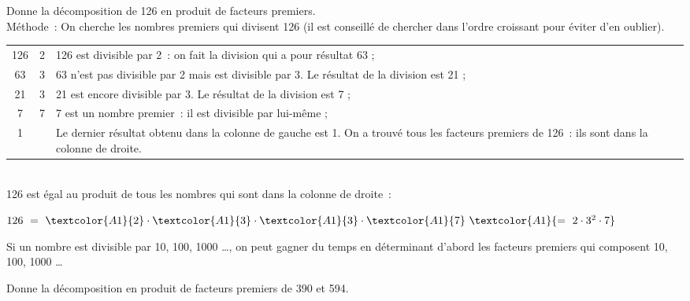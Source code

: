 \begin{methode*1}

\begin{exemple*1}
Donne la décomposition de 126 en produit de facteurs premiers.\\[1em]
Méthode : On cherche les nombres premiers qui divisent 126 (il est conseillé de chercher dans l'ordre croissant pour éviter d'en oublier). \\[1em]
\begin{tabularx}{\textwidth}{c|c|X}
 126 & \textcolor{A1}{2} & 126 est divisible par 2 : on fait la division qui a pour résultat 63 ; \\ 
 63 & \textcolor{A1}{3} & 63 n'est pas divisible par 2 mais est divisible par 3. Le résultat de la division est 21 ; \\
 21 & \textcolor{A1}{3} & 21 est encore divisible par 3. Le résultat de la division est 7 ; \\
7 & \textcolor{A1}{7} & 7 est un nombre premier : il est divisible par lui-même ; \\
1 & & Le dernier résultat obtenu dans la colonne de gauche est 1. On a trouvé tous les facteurs premiers de 126 : ils sont dans la colonne de droite. \\
\end{tabularx} \\[1em]
126 est égal au produit de tous les nombres qui sont dans la colonne de droite :
\begin{center} $126 = \textcolor{A1}{2} \cdot \textcolor{A1}{3} \cdot \textcolor{A1}{3} \cdot \textcolor{A1}{7} \textcolor{A1}{= 2 \cdot 3^2 \cdot 7}$ \end{center}
 \end{exemple*1}
 
\begin{remarque}
Si un nombre est divisible par 10, 100, 1000 \ldots, on peut gagner du temps en déterminant d'abord les facteurs premiers qui composent 10, 100, 1000 \ldots
\end{remarque}


\exercice  
Donne la décomposition en produit de facteurs premiers de 390 et 594.

\vspace{3em}

 \end{methode*1}
 
 
